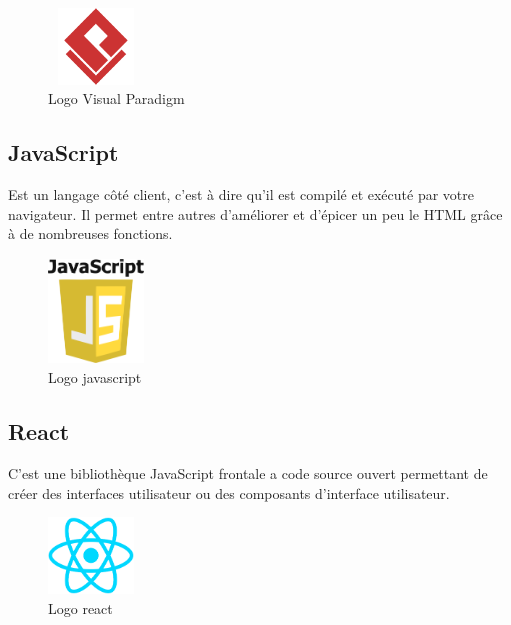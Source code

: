 \documentclass[12pt]{report}
\begin{document}
\vspace{0.1in}

\begin{figure}[h]
\centering
    \includegraphics[width = 1in, height = 0.8in]{../images/visualParadigm.png}
\caption{Logo Visual Paradigm}
\end{figure}

\subsection{JavaScript}
\vspace{0.1in}
\hspace*{0.16in}
Est un langage côté client, c'est à dire qu'il est compilé et exécuté par votre navigateur. Il permet entre autres d’améliorer et d'épicer un peu le HTML grâce à de nombreuses fonctions.

\vspace{0.1in}

\begin{figure}[h]
\centering
    \includegraphics[width = 1in, height = 1.1in]{../images/javascript.png}
\caption{Logo javascript}
\end{figure}

\subsection{React}
\vspace{0.1in}
\hspace*{0.16in}
C’est une bibliothèque JavaScript frontale a code source ouvert permettant de créer des interfaces utilisateur ou des composants d’interface utilisateur.

\vspace{0.1in}

\begin{figure}[h]
\centering
    \includegraphics[width = 0.9in, height = 0.8in]{../images/react.png}
\caption{Logo react}
\end{figure}
\end{document}
